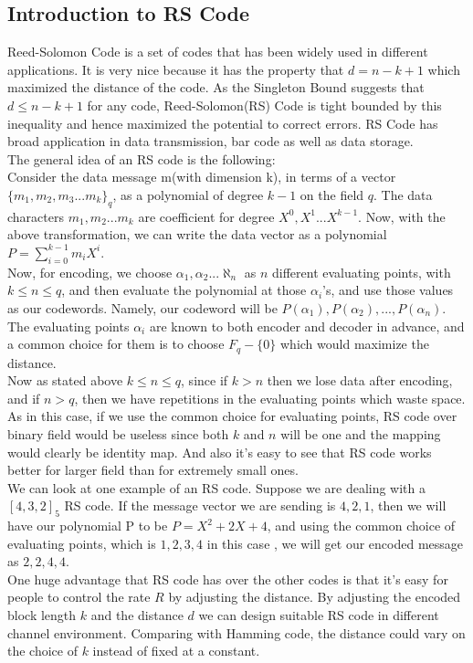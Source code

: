 \documentclass{article}
\begin{document}
\subsection{Introduction to RS Code} 
Reed-Solomon Code is a set of codes that has been widely used in different applications. It is very nice because it has the property that $d = n-k+1$ which maximized the distance of the code. As the Singleton Bound suggests that $d \le n-k+1$ for any code, Reed-Solomon(RS) Code is tight bounded by this inequality and hence maximized the potential to correct errors. RS Code has broad application in data transmission, bar code as well as data storage.\\
The general idea of an RS code is the following:\\
Consider the data message m(with dimension k), in terms of a vector\\ $\{m_1, m_2,m_3...m_k\}_q$, as a polynomial of degree $k-1$ on the field $q$. The data characters $m_1, m_2 ...m_k$ are coefficient for degree $X^0, X^1...X^{k-1}$. Now, with the above transformation, we can write the data vector as a polynomial $P = \sum_{i=0}^{k-1}m_iX^i$.\\
Now, for encoding, we choose $\alpha_1, \alpha_2...\aleph_n$ as $n$ different evaluating points, with $k \le n \le q$, and then evaluate the polynomial at those $\alpha_i$'s, and use those values as our codewords. Namely, our codeword will be ${P(\alpha_1), P(\alpha_2) , ... ,P(\alpha_n)}$. The evaluating points $\alpha_i$ are known to both encoder and decoder in advance, and a common choice for them is to choose $F_q - \{0\}$ which would maximize the distance.\\
Now as stated above $k \le n \le q$, since if $k >n$ then we lose data after encoding, and if $n > q$, then we have repetitions in the evaluating points which waste space. As in this case, if we use the common choice for evaluating points, RS code over binary field would be useless since both $k$ and $n$ will be one and the  mapping would clearly be identity map. And also it's easy to see that RS code works better for larger field than for extremely small ones.\\
We can look at one example of an RS code. Suppose we are dealing with a $[4,3,2]_5$ RS code. If the message vector we are sending is ${4, 2, 1}$, then we will have our polynomial P to be $P = X^2 + 2X + 4$, and using the common choice of evaluating points, which is ${1,2,3,4}$ in this case , we will get our encoded message as ${2, 2, 4,4}$.\\
One huge advantage that RS code has over the other codes is that it's easy for people to control the rate $R$ by adjusting the distance. By adjusting the encoded block length $k$ and the distance $d$ we can design suitable RS code in different channel environment. Comparing with Hamming code, the distance could vary on the choice of $k$ instead of fixed at a constant.
\end{document}
